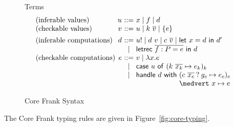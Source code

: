 \documentclass[preprint]{sigplanconf}
\makeatletter
\newcommand{\many}{\overline}
\newcommand\ba{\begin{array}}
\newcommand\ea{\end{array}}
\newcommand{\bstack}{\begin{array}[t]{@{}l@{}}}
\newcommand{\estack}{\end{array}}
\newenvironment{syntax}{\[\ba{@{}l@{~}r@{~}c@{~}l@{}}}{\ea\]}
\newcommand{\key}[1]{\mathsf{#1}}
\newcommand{\handleSymbol}{\mathbin{?}}
\newcommand{\handle}[2]{{#1} \handleSymbol {#2}}
\newcommand{\thunk}[1]{\{{#1}\}}
\newcommand{\force}[1]{{#1}!}
\newcommand\slab[1]{(\textrm{#1})}
\makeatother
\begin{document}
\begin{figure}
Terms
\begin{syntax}
\slab{inferable values}&u       &::=& x \mid f \mid d                                \\
\slab{checkable values}&v       &::=& u \mid k~\many{v} \mid \thunk{e}
\\[1ex]
\slab{inferable computations}&d &::=& \force{u} \mid d~v \mid c~\many{v}
                               \mid  \key{let}~x=d~\key{in}~d' \\
                             &&\mid& \key{letrec}~\many{f : P = e}~\key{in}~d \\
\slab{checkable computations} &e  &::= & v \mid \lambda x.e \\
   &&\mid& \key{case}~u~\key{of}~
             (k~\many{x_k} \mapsto e_k)_k \\
   &&\mid& \key{handle}~d~\key{with}~
             \bstack
             (\handle{c~\many{x_c}}{g_c} \mapsto e_c)_c \\
             \medvert~ x        \mapsto e \\
             \estack \\
\end{syntax}
\caption{Core Frank Syntax}
\label{fig:core-syntax}
\end{figure}
%
The Core Frank typing rules are given in Figure~\ref{fig:core-typing}.
%
\end{document}
